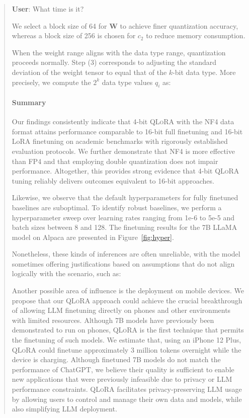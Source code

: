 \begin{quote}
    \textbf{User}: What time is it?

We select a block size of 64 for $\mathbf{W}$ to achieve finer quantization accuracy, whereas a block size of 256 is chosen for $c_2$ to reduce memory consumption.

When the weight range aligns with the data type range, quantization proceeds normally. Step (3) corresponds to adjusting the standard deviation of the weight tensor to equal that of the $k$-bit data type. More precisely, we compute the $2^k$ data type values $q_i$ as:

\paragraph{Summary} Our findings consistently indicate that 4-bit \textsc{QLoRA} with the NF4 data format attains performance comparable to 16-bit full finetuning and 16-bit LoRA finetuning on academic benchmarks with rigorously established evaluation protocols. We further demonstrate that NF4 is more effective than FP4 and that employing double quantization does not impair performance. Altogether, this provides strong evidence that 4-bit \textsc{QLoRA} tuning reliably delivers outcomes equivalent to 16-bit approaches.

Likewise, we observe that the default hyperparameters for fully finetuned baselines are suboptimal. To identify robust baselines, we perform a hyperparameter sweep over learning rates ranging from 1e-6 to 5e-5 and batch sizes between 8 and 128. The finetuning results for the 7B LLaMA model on Alpaca are presented in Figure~\ref{fig:hyper}.

Nonetheless, these kinds of inferences are often unreliable, with the model sometimes offering justifications based on assumptions that do not align logically with the scenario, such as:

Another possible area of influence is the deployment on mobile devices. We propose that our \textsc{QLoRA} approach could achieve the crucial breakthrough of allowing LLM finetuning directly on phones and other environments with limited resources. Although 7B models have previously been demonstrated to run on phones, \textsc{QLoRA} is the first technique that permits the finetuning of such models. We estimate that, using an iPhone 12 Plus, \textsc{QLoRA} could finetune approximately 3 million tokens overnight while the device is charging. Although finetuned 7B models do not match the performance of ChatGPT, we believe their quality is sufficient to enable new applications that were previously infeasible due to privacy or LLM performance constraints. \textsc{QLoRA} facilitates privacy-preserving LLM usage by allowing users to control and manage their own data and models, while also simplifying LLM deployment.


\end{quote}
